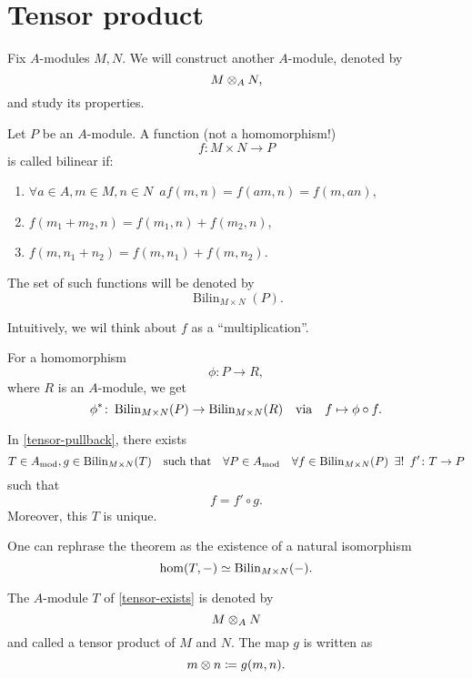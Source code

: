 \section{Tensor product}
Fix $A$-modules $M, N$. We will construct another $A$-module, denoted by
\[ M \otimes_A N,\]
and study its properties.

\begin{df}
  \label{def-bilinear}
  Let $P$ be an $A$-module. A function (not a homomorphism!)
  \[ f \colon M \times N \to P\]
  is called bilinear if:
  \begin{enumerate}
  \item $\forall a \in A, m \in M, n \in N \enspace a f(m, n) = f(am, n) = f(m, an)$,
  \item $f(m_1 + m_2, n) = f(m_1, n) + f(m_2, n)$,
  \item $f(m, n_1 + n_2) = f(m, n_1) + f(m, n_2)$.
  \end{enumerate}
  The set of such functions will be denoted by
  \[ \operatorname{Bilin}_{M \times N} (P).\]
\end{df}

Intuitively, we wil think about $f$ as a ``multiplication''.

\begin{example}
  \label{tensor-pullback}
  For a homomorphism
  \[ \phi \colon P \to R,\]
  where $R$ is an $A$-module, we get
  \[ \phi^* \colon \operatorname{Bilin}_{M \times N}(P) \to \operatorname{Bilin}_{M \times N}(R) \quad \text{via} \quad f \mapsto \phi \circ f.\]
\end{example}

\begin{theorem}
  \label{tensor-exists}
  In \cref{tensor-pullback}, there exists
  \[ T \in A_\text{mod}, g \in \operatorname{Bilin}_{M \times N}(T) \quad \text{such that} \quad \forall P \in A_\text{mod} \quad \forall f \in \operatorname{Bilin}_{M \times N}(P) \enspace \exists \text{!} \enspace f' \colon T \to P\]
  such that
  \[ f = f' \circ g.\]
  Moreover, this $T$ is unique.
\end{theorem}

\begin{note}
  One can rephrase the theorem as the existence of a natural isomorphism
  \[ \hom(T, -) \simeq \operatorname{Bilin}_{M \times N}(-).\]
\end{note}

\begin{df}
  The $A$-module $T$ of \cref{tensor-exists} is denoted by
  \[ M \otimes_A N \]
  and called a tensor product of $M$ and $N$.
  The map $g$ is written as
  \[ m \otimes n \coloneqq g(m, n).\]
\end{df}

